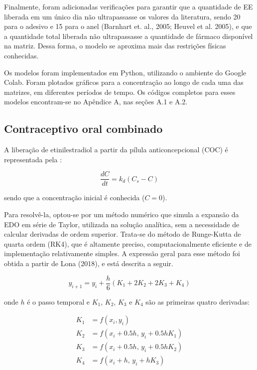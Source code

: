 Finalmente, foram adicionadas verificações para garantir que a quantidade de EE liberada em um único dia não ultrapassasse os valores da literatura, sendo 20 \textmu para o adesivo e  15 \textmu para o anel (Barnhart et. al., 2005; Heuvel et al. 2005), e que a quantidade total liberada não ultrapassasse a quantidade de fármaco disponível na matriz. Dessa forma, o modelo se aproxima mais das restrições físicas conhecidas.

Os modelos foram implementados em Python, utilizando o ambiente do Google Colab. Foram plotados gráficos para a concentração ao longo de cada uma das matrizes, em diferentes períodos de tempo. Os códigos completos para esses modelos encontram-se no Apêndice A, nas seções A.1 e A.2.

\subsection{Contraceptivo oral combinado}

A liberação de etinilestradiol a partir da pílula anticoncepcional (COC) é representada pela :

\begin{equation}
    \frac{dC}{dt} = k_d (C_s - C)
\end{equation}

\noindent sendo que a concentração inicial é conhecida ($C = 0$). 

Para resolvê-la, optou-se por um método numérico que simula a expansão da EDO em série de Taylor, utilizada na solução analítica, sem a necessidade de calcular derivadas de ordem superior. Trata-se do método de Runge-Kutta de quarta ordem (RK4), que é altamente preciso, computacionalmente eficiente e de implementação relativamente simples. A expressão geral para esse método foi obtida a partir de Lona (2018), e está descrita a seguir.

\begin{equation}
    y_{i+1} = y_i + \frac{h}{6} (K_1 + 2K_2 + 2K_3 + K_4) 
\end{equation}

\noindent onde $h$ é o passo temporal e $K_1$, $K_2$, $K_3$ e $K_4$ são as primeiras quatro derivadas:

\begin{equation}
\begin{aligned}
    K_1 &= f(x_i, y_i) \\
    K_2 &= f(x_i + 0.5h, \, y_i + 0.5h K_1) \\
    K_3 &= f(x_i + 0.5h, \, y_i + 0.5h K_2) \\
    K_4 &= f(x_i + h, \, y_i + h K_3)
\end{aligned}
\end{equation}

